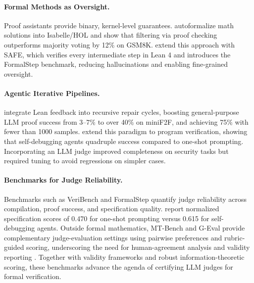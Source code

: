 \documentclass{article}
\begin{document}
\paragraph{Formal Methods as Oversight.}
Proof assistants provide binary, kernel-level guarantees. \citet{zhou2024donttrustverify} autoformalize math solutions into Isabelle/HOL and show that filtering via proof checking outperforms majority voting by 12\% on GSM8K. \citet{liu2025safe} extend this approach with SAFE, which verifies every intermediate step in Lean 4 and introduces the FormalStep benchmark, reducing hallucinations and enabling fine-grained oversight.

\paragraph{Agentic Iterative Pipelines.}
\citet{ospanov2023apollo} integrate Lean feedback into recursive repair cycles, boosting general-purpose LLM proof success from 3--7\% to over 40\% on miniF2F, and achieving 75\% with fewer than 1000 samples. \citet{miranda2025veribench} extend this paradigm to program verification, showing that self-debugging agents quadruple success compared to one-shot prompting.
Incorporating an LLM judge improved completeness on security tasks but required tuning to avoid regressions on simpler cases.

\paragraph{Benchmarks for Judge Reliability.}
Benchmarks such as VeriBench and FormalStep quantify judge reliability across compilation, proof success, and specification quality.
\citet{miranda2025veribench} report normalized specification scores of 0.470 for one-shot prompting versus 0.615 for self-debugging agents.
Outside formal mathematics, MT-Bench and G-Eval provide complementary judge-evaluation settings using pairwise preferences and rubric-guided scoring, underscoring the need for human-agreement analysis and validity reporting \citep{Zheng2023MTBench,Liu2023GEval}.
Together with validity frameworks and robust information-theoretic scoring, these benchmarks advance the agenda of certifying LLM judges for formal verification.

\end{document}
